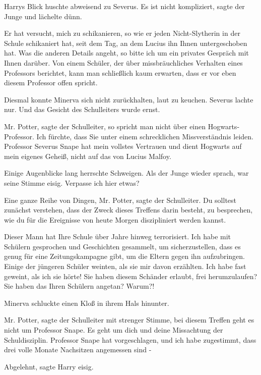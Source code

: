 Harrys Blick huschte abweisend zu Severus. \glqq{}Es ist nicht
kompliziert\grqq{}, sagte der Junge und lächelte dünn.

\glqq{}Er hat versucht, mich zu schikanieren, so wie er jeden Nicht-Slytherin in
der Schule schikaniert hat, seit dem Tag, an dem Lucius ihn Ihnen untergeschoben
hat. Was die anderen Details angeht, so bitte ich um ein privates Gespräch mit
Ihnen darüber. Von einem Schüler, der über missbräuchliches Verhalten eines
Professors berichtet, kann man schließlich kaum erwarten, dass er vor eben
diesem Professor offen spricht.\grqq{}

Diesmal konnte Minerva sich nicht zurückhalten, laut zu keuchen. Severus lachte
nur. Und das Gesicht des Schulleiters wurde ernst.

\glqq{}Mr. Potter\grqq{}, sagte der Schulleiter, \glqq{}so spricht man nicht über
einen Hogwarts-Professor. Ich fürchte, dass Sie unter einem schrecklichen
Missverständnis leiden. Professor Severus Snape hat mein vollstes Vertrauen und
dient Hogwarts auf mein eigenes Geheiß, nicht auf das von Lucius Malfoy.\grqq{}

Einige Augenblicke lang herrschte Schweigen. Als der Junge wieder sprach, war
seine Stimme eisig. \glqq{}Verpasse ich hier etwas?\grqq{}

\glqq{}Eine ganze Reihe von Dingen, Mr. Potter\grqq{}, sagte der Schulleiter.
\glqq{}Du solltest zunächst verstehen, dass der Zweck dieses Treffens darin
besteht, zu besprechen, wie du für die Ereignisse von heute Morgen diszipliniert
werden kannst.\grqq{}

\glqq{}Dieser Mann hat Ihre Schule über Jahre hinweg terrorisiert. Ich habe mit
Schülern gesprochen und Geschichten gesammelt, um sicherzustellen, dass es genug
für eine Zeitungskampagne gibt, um die Eltern gegen ihn aufzubringen. Einige der
jüngeren Schüler weinten, als sie mir davon erzählten. Ich habe fast geweint,
als ich sie hörte! Sie haben diesem Schänder erlaubt, frei herumzulaufen? Sie
haben das Ihren Schülern angetan? Warum?!\grqq{}

Minerva schluckte einen Kloß in ihrem Hals hinunter.

\glqq{}Mr. Potter\grqq{}, sagte der Schulleiter mit strenger Stimme, \glqq{}bei
diesem Treffen geht es nicht um Professor Snape. Es geht um dich und deine
Missachtung der Schuldisziplin. Professor Snape hat vorgeschlagen, und ich habe
zugestimmt, dass drei volle Monate Nachsitzen angemessen sind -\grqq{}

\glqq{}Abgelehnt\grqq{}, sagte Harry eisig.

